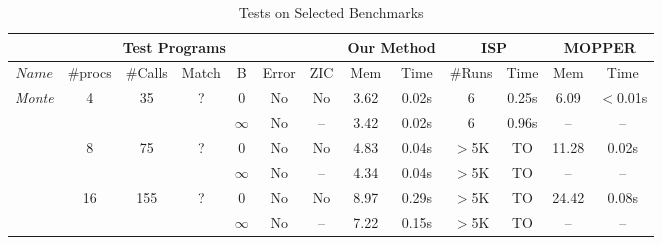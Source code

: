 \begin{savenotes}
\begin{table*}[t]
\begin{center}
\scriptsize
\caption{Tests on Selected Benchmarks}\label{table:benchmarks}
     \begin{threeparttable}
\begin{tabular}{|c|c|c|c|c|c|c||c|c||c|c||c|c|}
		\hline
         \multicolumn{7}{|c||}{Test Programs} & \multicolumn{2}{c||}{Our Method} & \multicolumn{2}{c||}{ISP} & \multicolumn{2}{c|}{MOPPER}  \\ \hline
          $Name$ & \#procs & \#Calls&Match&B&Error & ZIC &Mem & Time &\#Runs&Time & Mem & Time\\ \hline
          \multirow{6}{*}{\textit{Monte}} & \multirow{2}{*}{4} & \multirow{2}{*}{35} &  \multirow{2}{*}{?} 
          												     & 0 & No & No\tnote{\textdagger} & 3.62 & 0.02s & 6 & 0.25s & 6.09 & $<$0.01s\\ \cline{5-13}
          						       &                            & &  &  $\infty$ & No & -- & 3.42 & 0.02s & 6 & 0.96s &  -- & --\\ \cline{2-13}
						       		& \multirow{2}{*}{8} & \multirow{2}{*}{75} &  \multirow{2}{*}{?} 
          												     & 0 & No & No\tnote{\textdagger} & 4.83 & 0.04s & $>$5K & TO & 11.28 & 0.02s\\ \cline{5-13}
          						       &                            & &  &  $\infty$ & No & -- & 4.34 & 0.04s & $>$5K & TO &  -- & --\\ \cline{2-13}
						              & \multirow{2}{*}{16} & \multirow{2}{*}{155} &  \multirow{2}{*}{?} 
          												     & 0 & No & No\tnote{\textdagger} & 8.97 & 0.29s & $>$5K & TO & 24.42 & 0.08s\\ \cline{5-13}
          						       &                            & &  &  $\infty$ & No & -- & 7.22 & 0.15s & $>$5K & TO & --  & --\\ \hline
						       \hline
						       

\end{tabular}
\end{threeparttable}
\end{center}
\end{table*}
\end{savenotes}
